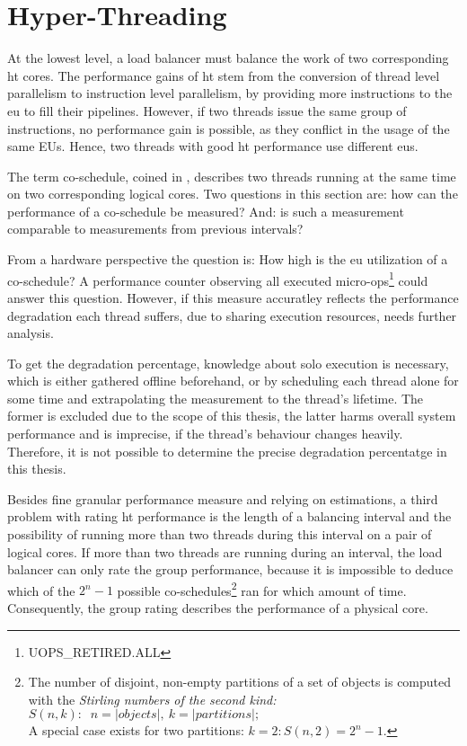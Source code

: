 \section{Hyper-Threading}
\label{design:smt}


At the lowest level, a load balancer must balance the work of two corresponding
\gls{ht} cores.
The performance gains of \gls{ht} stem from the conversion of thread level
parallelism to instruction level parallelism, by providing more instructions to
the \gls{eu} to fill their pipelines.
However, if two threads issue the same group of instructions, no performance gain is
possible, as they conflict in the usage of the same EUs.
Hence, two threads with good \gls{ht} performance use different \gls{eu}s.

The term co-schedule, coined in \cite{snavely_symbiotic_2000}, describes two
threads running at the same time on two corresponding logical cores.
Two questions in this section are: how can the performance of a co-schedule be
measured? And: is such a measurement comparable to measurements from previous
intervals?

From a hardware perspective the question is: How high is the \gls{eu}
utilization of a co-schedule?
A performance counter observing all executed
micro-ops\footnote{UOPS\_RETIRED.ALL} could answer this question.
However, if this measure accuratley reflects the performance degradation each thread
suffers, due to sharing execution resources, needs further analysis.

To get the degradation percentage, knowledge about solo execution is necessary,
which is either gathered offline beforehand, or by scheduling each thread alone
for some time and extrapolating the measurement to the thread's lifetime.
The former is excluded due to the scope of this thesis, the latter harms
overall system performance and is imprecise, if the thread's behaviour changes
heavily.
Therefore, it is not possible to determine the precise degradation percentatge
in this thesis.

Besides fine granular performance measure and relying on estimations, a third
problem with rating \gls{ht} performance is the length of a balancing interval
and the possibility of running more than two threads during this interval on a
pair of logical cores.
If more than two threads are running during an interval, the load balancer can
only rate the group performance, because it is impossible to deduce which
of the
$2^n-1$ possible co-schedules\footnote{The number of disjoint, non-empty partitions of a set of
  objects is computed with the \emph{Stirling numbers of the second kind:}
  $S(n,k):\;\; n = |objects|,\: k = |partitions|;$\\A special case exists for
two partitions: $k = 2: S(n,2) = 2^n-1$.}
%
 ran for which amount of time.
Consequently, the group rating describes the performance of a physical core.


